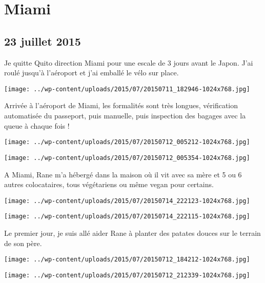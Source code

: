 \chapter{Miami}
\section*{23 juillet 2015}
Je quitte Quito direction Miami pour une escale de 3 jours avant le Japon. \newline
 J'ai roulé jusqu'à l'aéroport et j'ai emballé le vélo sur place. \newline
 \newline
\centerline{\texttt{[image: ../wp-content/uploads/2015/07/20150711\_182946-1024x768.jpg]} } 
 \newline
 Arrivée à l'aéroport de Miami, les formalités sont très longues, vérification automatisée du passeport, puis manuelle, puis inspection des bagages avec la queue à chaque fois ! \newline
 \newline
\centerline{\texttt{[image: ../wp-content/uploads/2015/07/20150712\_005212-1024x768.jpg]} } 
 \newline
 \newline
\centerline{\texttt{[image: ../wp-content/uploads/2015/07/20150712\_005354-1024x768.jpg]} } 
 \newline
 A Miami, Rane m'a hébergé dans la maison où il vit avec sa mère et 5 ou 6 autres colocataires, tous végétariens ou même vegan pour certains. \newline
 \newline
\centerline{\texttt{[image: ../wp-content/uploads/2015/07/20150714\_222123-1024x768.jpg]} } 
 \newline
 \newline
\centerline{\texttt{[image: ../wp-content/uploads/2015/07/20150714\_222115-1024x768.jpg]} } 
 \newline
 Le premier jour, je suis allé aider Rane à planter des patates douces sur le terrain de son père. \newline
 \newline
\centerline{\texttt{[image: ../wp-content/uploads/2015/07/20150712\_184212-1024x768.jpg]} } 
 \newline
 \newline
\centerline{\texttt{[image: ../wp-content/uploads/2015/07/20150712\_212339-1024x768.jpg]} } 
 \newline
